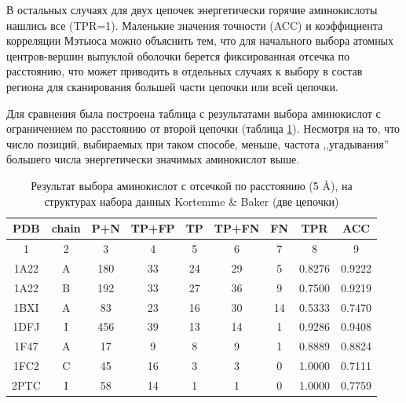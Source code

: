 В остальных случаях для двух цепочек энергетически горячие аминокислоты нашлись все (TPR=1). Маленькие значения точности (ACC) и коэффициента корреляции Мэтьюса можно объяснить тем, что для начального выбора атомных центров-вершин выпуклой оболочки берется фиксированная отсечка по расстоянию, что может приводить в отдельных случаях к выбору в состав региона для сканирования большей части цепочки или всей цепочки.

Для сравнения была построена таблица с результатами выбора аминокислот с ограничением по расстоянию от второй цепочки (таблица \ref{tab:comparison2}). Несмотря на то, что число позиций, выбираемых при таком способе, меньше, частота ,,угадывания'' большего числа энергетически значимых аминокислот выше.
\begin{table}[h]
\begin{center}
\caption{Результат выбора аминокислот с отсечкой по расстоянию (5 \AA{}), на структурах набора данных Kortemme \& Baker (две цепочки) }
\label{tab:comparison2}
\begin{tabular}{|c|c|c|c|c|c|c|c|c|}
\hline
 PDB & chain & P+N & TP+FP & TP & TP+FN & FN & TPR & ACC \\
 \hline
  1 & 2 & 3 & 4 & 5 & 6 & 7 & 8 & 9 \\
 \hline
1A22 & A & 180 & 33 & 24 & 29 & 5 & 0.8276 & 0.9222\\
1A22 & B & 192 & 33 & 27 & 36 & 9 & 0.7500 & 0.9219\\
1BXI & A & 83 & 23 & 16 & 30 & 14 & 0.5333 & 0.7470\\
1DFJ & I & 456 & 39 & 13 & 14 & 1 & 0.9286 & 0.9408\\
1F47 & A & 17 & 9 & 8 & 9 & 1 & 0.8889 & 0.8824\\
1FC2 & C & 45 & 16 & 3 & 3 & 0 & 1.0000 & 0.7111\\
2PTC & I & 58 & 14 & 1 & 1 & 0 & 1.0000 & 0.7759\\
\hline
\end{tabular}
\end{center}
\end{table}


